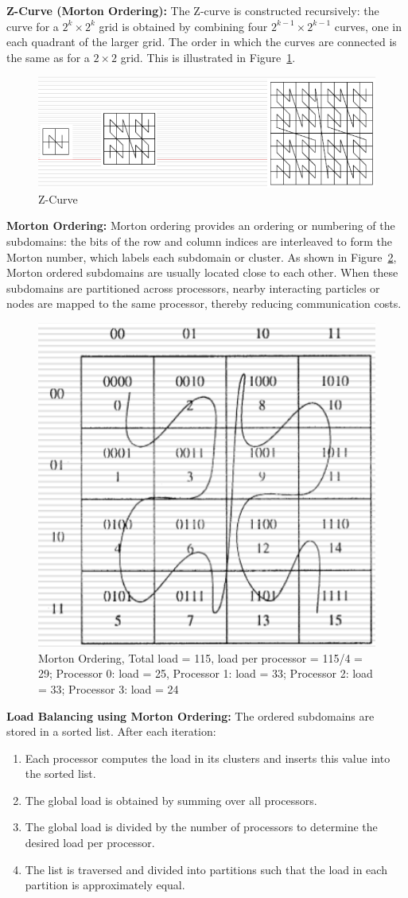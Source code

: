 \documentclass[12pt]{book}
\begin{document}
\textbf{Z-Curve (Morton Ordering):} 
The Z-curve is constructed recursively: the curve for a $2^k \times 2^k$ grid is obtained by combining four $2^{k-1} \times 2^{k-1}$ curves, one in each quadrant of the larger grid. The order in which the curves are connected is the same as for a $2 \times 2$ grid. This is illustrated in Figure~\ref{fig:zcurve}. 
\begin{figure}[ht]
    \centering
    \includegraphics[width=0.65\linewidth]{images/zcurve.png}
    \caption{Z-Curve}
    \label{fig:zcurve}
\end{figure}
\textbf{Morton Ordering:} 
Morton ordering provides an ordering or numbering of the subdomains: the bits of the row and column indices are interleaved to form the Morton number, which labels each subdomain or cluster. As shown in Figure~\ref{fig:mortonord}, Morton ordered subdomains are usually located close to each other. When these subdomains are partitioned across processors, nearby interacting particles or nodes are mapped to the same processor, thereby reducing communication costs.
\begin{figure}[ht]
    \centering
    \includegraphics[width=0.5\linewidth]{images/mortonord.png}
    \caption{Morton Ordering, Total load = 115, load per processor = 115/4 = 29; Processor 0: load = 25, Processor 1: load = 33; Processor 2: load = 33; Processor 3: load = 24}
    \label{fig:mortonord}
\end{figure}
\textbf{Load Balancing using Morton Ordering:} 
The ordered subdomains are stored in a sorted list. After each iteration:
\begin{enumerate}
    \item Each processor computes the load in its clusters and inserts this value into the sorted list.
    \item The global load is obtained by summing over all processors.
    \item The global load is divided by the number of processors to determine the desired load per processor.
    \item The list is traversed and divided into partitions such that the load in each partition is approximately equal.
\end{enumerate}
\end{document}
